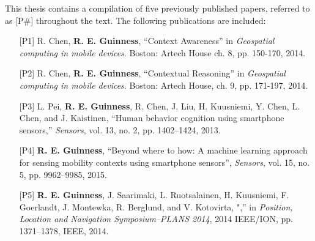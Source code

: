 This thesis contains a compilation of five previously published papers, referred to as [P\#] throughout the text. The following publications are included:

\begin{itemize}[leftmargin=2cm,labelsep=0.5cm]

\item [{[P1]}] R. Chen, \textbf{R. E. Guinness}, ``Context Awareness'' in \emph{Geospatial computing in mobile devices}. Boston: Artech House ch. 8, pp. 150-170, 2014.
\item [{[P2]}] R. Chen, \textbf{R. E. Guinness}, ``Contextual Reasoning'' in \emph{Geospatial computing in mobile devices}. Boston: Artech House, ch. 9, pp. 171-197, 2014.
\item [{[P3]}] L. Pei, \textbf{R. E. Guinness}, R. Chen, J. Liu, H. Kuusniemi, Y. Chen, L. Chen, and J. Kaistinen, ``Human behavior cognition using smartphone sensors,'' \emph{Sensors}, vol. 13, no. 2, pp. 1402--1424, 2013.

\item [{[P4]}] \textbf{R. E. Guinness}, ``Beyond where to how: A machine learning approach for sensing mobility contexts using smartphone sensors'', \emph{Sensors}, vol. 15, no. 5, pp. 9962--9985, 2015.

\item [{[P5]}] \textbf{R. E. Guinness}, J. Saarimaki, L. Ruotsalainen, H. Kuusniemi, F. Goerlandt, J. Montewka, R. Berglund, and V. Kotovirta, ",'' in \emph{Position, Location and Navigation Symposium--PLANS 2014}, 2014 IEEE/ION, pp. 1371–1378, IEEE, 2014.

\end{itemize}
